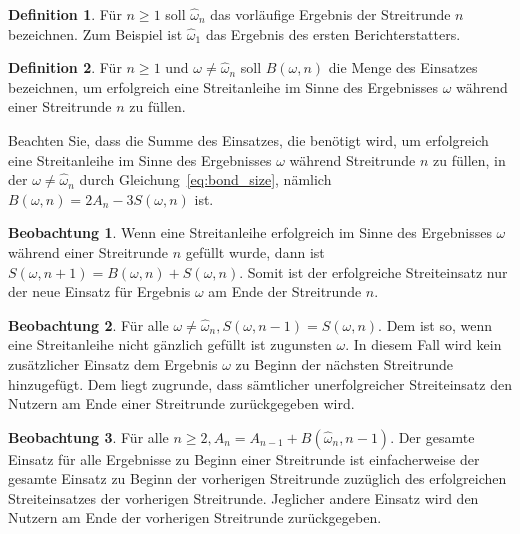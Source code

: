 \documentclass[floatfix,reprint,nofootinbib,amsmath,amssymb,epsfig,pre,floats,letterpaper,groupedaffiliation]{revtex4-1}
\theoremstyle{definition}
\newtheorem{observation}{Beobachtung}
\theoremstyle{definition}
\newtheorem{definition}{Definition}
\theoremstyle{definition}
\begin{document}
\begin{appendix}
\begin{definition}
Für $n \geq 1$ soll $\hat{\omega}_{n}$ das vorläufige Ergebnis der Streitrunde $n$ bezeichnen. Zum Beispiel ist $\hat{\omega}_{1}$ das Ergebnis des ersten Berichterstatters.
\end{definition}

\begin{definition}
Für $n \geq 1$ und $\omega \neq \hat{\omega}_{n}$ soll $B(\omega,n)$ die Menge des Einsatzes bezeichnen, um erfolgreich eine Streitanleihe im Sinne des Ergebnisses $\omega$ während einer Streitrunde $n$ zu füllen.
\end{definition}

Beachten Sie, dass die Summe des Einsatzes, die benötigt wird, um erfolgreich eine Streitanleihe im Sinne des Ergebnisses $\omega$ während Streitrunde $n$ zu füllen, in der $\omega \neq \hat{\omega}_{n}$ durch Gleichung~\ref{eq:bond_size}, nämlich $B(\omega,n) = 2A_{n} - 3S(\omega,n)$ ist.

\begin{observation}\label{ob:only_successfull_bond_stake_applies_v1}
Wenn eine Streitanleihe erfolgreich im Sinne des Ergebnisses $\omega$ während einer Streitrunde $n$ gefüllt wurde, dann ist $S(\omega,n+1)=B(\omega,n)+S(\omega,n)$. Somit ist der erfolgreiche Streiteinsatz nur der neue Einsatz für Ergebnis $\omega$ am Ende der Streitrunde $n$.
\end{observation}

\begin{observation}\label{ob:only_successfull_bond_stake_applies_v2}
Für alle $\omega \neq \hat{\omega}_{n}, S(\omega,n-1)=S(\omega,n)$. Dem ist so, wenn eine Streitanleihe nicht gänzlich gefüllt ist zugunsten $\omega$. In diesem Fall wird kein zusätzlicher Einsatz dem Ergebnis $\omega$ zu Beginn der nächsten Streitrunde hinzugefügt. Dem liegt zugrunde, dass sämtlicher unerfolgreicher Streiteinsatz den Nutzern am Ende einer Streitrunde zurückgegeben wird.
\end{observation}

\begin{observation}\label{ob:only_successfull_bond_stake_applies_v3}
Für alle $n \geq 2, A_{n} = A_{n-1} + B(\hat{\omega}_{n},n-1)$. Der gesamte Einsatz für alle Ergebnisse zu Beginn einer Streitrunde ist einfacherweise der gesamte Einsatz zu Beginn der vorherigen Streitrunde zuzüglich des erfolgreichen Streiteinsatzes der vorherigen Streitrunde. Jeglicher andere Einsatz wird den Nutzern am Ende der vorherigen Streitrunde zurückgegeben.
\end{observation}


\end{appendix}
\end{document}
